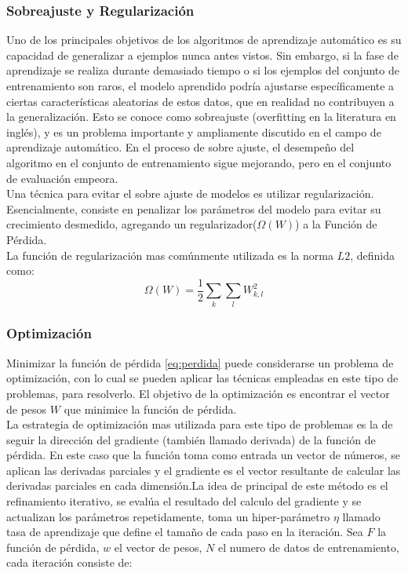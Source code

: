 \documentclass[a4paper,11pt,spanish]{book}
\begin{document}
	\subsubsection {Sobreajuste y Regularización}
	  Uno de los principales objetivos de los algoritmos de aprendizaje automático es su capacidad de generalizar a ejemplos nunca antes vistos. Sin embargo, si la fase
	  de aprendizaje se realiza durante demasiado tiempo o si los ejemplos del conjunto de entrenamiento son raros, el modelo aprendido podría ajustarse específicamente
	  a ciertas características aleatorias de estos datos, que en realidad no contribuyen a la generalización. Esto se conoce como sobreajuste (overfitting en la literatura en inglés),
	  y es un problema importante y ampliamente discutido en el campo de aprendizaje automático. En el proceso de sobre ajuste, el desempeño del algoritmo en el
	  conjunto de entrenamiento sigue mejorando, pero en el conjunto de evaluación empeora.\\
	  Una técnica para evitar el sobre ajuste de modelos es utilizar regularización. Esencialmente, consiste en penalizar los parámetros del modelo para evitar su
	  crecimiento desmedido, agregando un regularizador($\Omega(W)$) a la Función de Pérdida. \\
	  La función de regularización mas comúnmente utilizada es la norma $L2$, definida como:
	   \begin{equation*}
	    \Omega(W) = \frac{1}{2} {\sum_{k} {\sum_{l}} W_{k,l}^2}
	   \end{equation*}

    \subsubsection{Optimización}
      Minimizar la función de pérdida \eqref{eq:perdida} puede considerarse un problema de optimización, con lo cual se pueden aplicar las técnicas empleadas en este tipo de problemas, para resolverlo.
      El objetivo de la optimización es encontrar el vector de pesos $W$ que minimice la función de pérdida.\\
      La estrategia de optimización mas utilizada para este tipo de problemas es la de seguir la dirección del gradiente (también llamado derivada) de la función de pérdida.
      En este caso que la función toma como entrada un vector de números, se aplican las derivadas parciales y el gradiente es el vector resultante de calcular las derivadas parciales
      en cada dimensión.La idea de principal de este método es el refinamiento iterativo, se evalúa el resultado del calculo del gradiente y se actualizan los parámetros repetidamente,
      toma un hiper-parámetro $\eta$ llamado tasa de aprendizaje que define el tamaño de cada paso en la iteración.
      Sea $F$ la función de pérdida, $w$ el vector de pesos, $N$ el numero de datos de entrenamiento, cada iteración consiste de:
\end{document}
